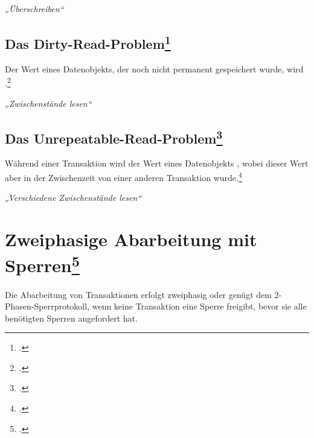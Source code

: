 \documentclass{lehramt-informatik-haupt}
\begin{document}
\emph{„Überschreiben“}

%

\subsection{Das Dirty-Read-Problem\footcite{wiki:schreib-lese-konflikt}}

Der Wert eines Datenobjekts, der noch nicht permanent gespeichert wurde,
wird .\footcite[11.1.2 Abhängigkeit von nicht freigegebenen Änderungen, Seite 332]{kemper}

\emph{„Zwischenstände lesen“}

%

\subsection{Das Unrepeatable-Read-Problem\footcite{wiki:nichtwiederholbares-lesen}}

Während einer Transaktion wird der Wert eines Datenobjekts
, wobei dieser Wert aber in der Zwischenzeit von
einer anderen Transaktion  wurde.\footcite[11.1.3 Phantomproblem, Seite 333]{kemper}

\emph{„Verschiedene Zwischenstände lesen“}

%

\section{Zweiphasige Abarbeitung mit Sperren\footcite[Seite 15]{db:fs:5}}

Die Abarbeitung von Transaktionen erfolgt zweiphasig oder genügt dem
2-Phasen-Sperrprotokoll, wenn keine Transaktion eine Sperre freigibt,
bevor sie alle benötigten Sperren angefordert hat.
\end{document}
